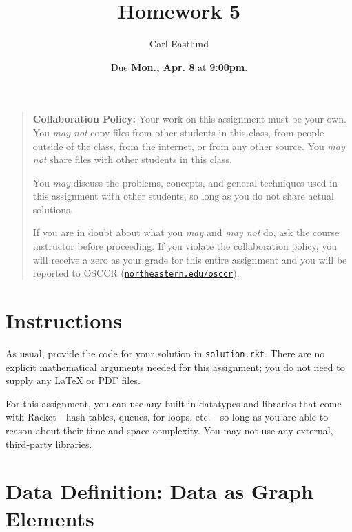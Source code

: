 \documentclass{article}
\title{Homework 5}
\author{Carl Eastlund}
\date{Due \textbf{Mon., Apr. 8} at \textbf{9:00pm}.}
\begin{document}
\maketitle

\newcommand\link[2][http://]{\href{#1#2}{\nolinkurl{#2}}}
\newcommand\http[1]{\link[http://]{#1}}
\newcommand\https[1]{\link[https://]{#1}}
\newcommand\email[1]{\link[mailto:]{#1}}

\begin{quotation}

  \noindent \textbf{Collaboration Policy:} Your work on this assignment must be
  your own.  You \emph{may not} copy files from other students in this class,
  from people outside of the class, from the internet, or from any other source.
  You \emph{may not} share files with other students in this class.

  \medskip

  \noindent You \emph{may} discuss the problems, concepts, and general
  techniques used in this assignment with other students, so long as you do not
  share actual solutions.

  \medskip

  \noindent If you are in doubt about what you \emph{may} and \emph{may not} do,
  ask the course instructor before proceeding.  If you violate the collaboration
  policy, you will receive a zero as your grade for this entire assignment and
  you will be reported to OSCCR (\link{northeastern.edu/osccr}).

\end{quotation}

\bigskip

\newcommand\file\texttt
\newcommand\code\texttt

\section{Instructions}

As usual, provide the code for your solution in \file{solution.rkt}.  There are
no explicit mathematical arguments needed for this assignment; you do not need
to supply any \LaTeX{} or PDF files.

For this assignment, you can use any built-in datatypes and libraries that come
with Racket---hash tables, queues, for loops, etc.---so long as you are able to
reason about their time and space complexity.  You may not use any external,
third-party libraries.

\newpage
\section{Data Definition: Data as Graph Elements}
\end{document}
